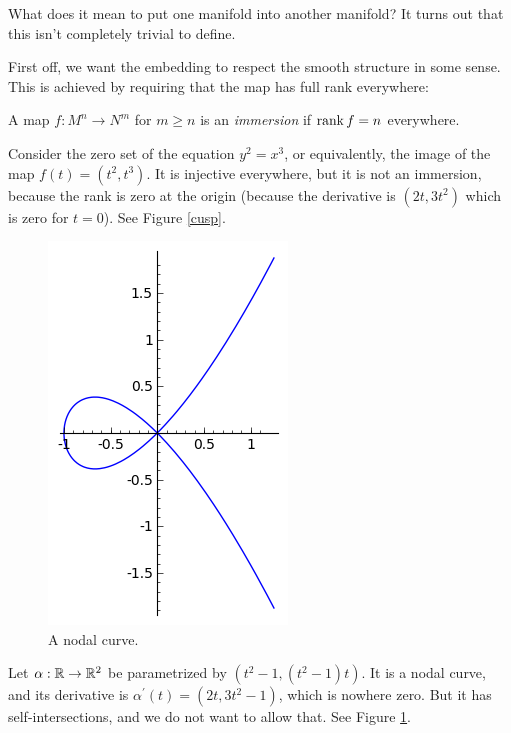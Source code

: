 \documentclass[11pt, english]{article}
\begin{document}
What does it mean to put one manifold into another manifold? It turns out that this isn't completely trivial to define.

First off, we want the embedding to respect the smooth structure in some sense. This is achieved by requiring that the map has full rank everywhere:

\begin{defi}
A map $f:M^n \to N^m$ for $m \geq n$ is an \emph{immersion} if $\operatorname{\mathrm{rank}} f = n$ everywhere.
\end{defi}

\begin{example}
Consider the zero set of the equation $y^2=x^3$, or equivalently, the image of the map $f(t)=(t^2,t^3)$. It is injective everywhere, but it is not an immersion, because the rank is zero at the origin (because the derivative is $(2t,3t^2)$ which is zero for $t=0$). See Figure \ref{cusp}.
\end{example}


\begin{figure}[th]
\centering
\includegraphics{node}
\caption{A nodal curve.}
\label{node}
\end{figure}

\begin{example}
Let $\alpha:\mathbb{R} \to \mathbb{R}^2$ be parametrized by $\left(t^2-1,(t^2-1)t\right)$. It is a nodal curve, and its derivative is $\alpha^\prime(t) = \left(2t,3t^2-1\right)$, which is nowhere zero. But it has self-intersections, and we do not want to allow that. See Figure \ref{node}.
\end{example}
\end{document}
